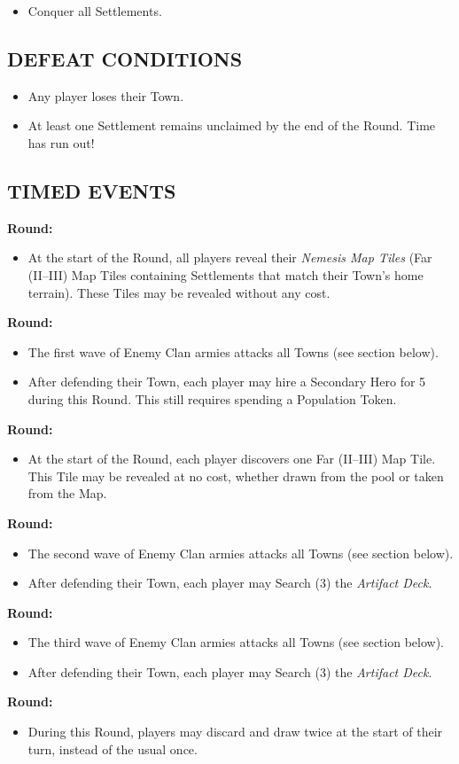 \begin{multicols}{2}
\begin{itemize}
   \item Conquer all Settlements.
\end{itemize}

\subsection*{\MakeUppercase{Defeat Conditions}}

\begin{itemize}
  \item Any player loses their Town.
  \item At least one Settlement remains unclaimed by the end of the  Round. Time has run out!
\end{itemize}

\subsection*{\MakeUppercase{Timed Events}}
\textbf{ Round:}
\begin{itemize}
  \item At the start of the Round, all players reveal their \textit{Nemesis Map Tiles} (Far (II--III) Map Tiles containing Settlements that match their Town's home terrain). These Tiles may be revealed without any cost.
\end{itemize}
\textbf{ Round:}
\begin{itemize}
  \item The first wave of Enemy Clan armies attacks all Towns (see section below).
  \item After defending their Town, each player may hire a Secondary Hero for 5~ during this Round. This still requires spending a Population Token.
\end{itemize}
\textbf{ Round:}
\begin{itemize}
  \item At the start of the Round, each player discovers one Far (II--III) Map Tile. This Tile may be revealed at no cost, whether drawn from the pool or taken from the Map.
\end{itemize}
\textbf{ Round:}
\begin{itemize}
  \item The second wave of Enemy Clan armies attacks all Towns (see section below).
  \item After defending their Town, each player may Search (3) the \textit{Artifact Deck}.
\end{itemize}
\textbf{ Round:}
\begin{itemize}
  \item The third wave of Enemy Clan armies attacks all Towns (see section below).
  \item After defending their Town, each player may Search (3) the \textit{Artifact Deck}.
\end{itemize}
\textbf{ Round:}
\begin{itemize}
  \item During this Round, players may discard and draw twice at the start of their turn, instead of the usual once.
\end{itemize}


\end{multicols}

